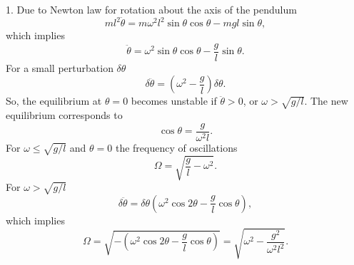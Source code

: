 \documentclass[12pt,a4paper,pdflatex]{disser}
\begin{document}
1. Due to Newton law for rotation about the axis of the pendulum
$$
  ml^2 \ddot{\theta}=m\omega^2 l^2\sin\theta \cos\theta-mgl\sin\theta,
$$
which implies
$$
  \ddot{\theta}=\omega^2 \sin\theta \cos\theta-\frac{g}{l}\sin\theta.
$$
For a small perturbation $\delta\theta$
$$
  \delta\ddot{\theta}=\left(\omega^2-\frac{g}{l}\right)\delta\theta.
$$
So, the equilibrium at $\theta=0$ becomes unstable if $\ddot{\theta}>0$, or $\omega>\sqrt{g/l}$. The new equilibrium corresponds to
$$
  \cos\theta=\frac{g}{\omega^2 l}.
$$
For $\omega\le\sqrt{g/l}$ and $\theta=0$ the frequency of oscillations
$$
  \Omega=\sqrt{\frac{g}{l}-\omega^2}.
$$
For $\omega>\sqrt{g/l}$
$$
  \delta\ddot{\theta}=\delta\theta\left(\omega^2 \cos 2\theta-\frac{g}{l}\cos\theta\right),
$$
which implies
$$
  \Omega=\sqrt{-\left(\omega^2 \cos 2\theta-\frac{g}{l}\cos\theta\right)}=\sqrt{\omega^2-\frac{g^2}{\omega^2 l^2}}.
$$
\end{document}
